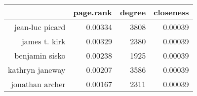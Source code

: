 \begin{table}[ht]
\centering
\begin{tabular}{rrrr}
  \hline
 & page.rank & degree & closeness \\ 
  \hline
jean-luc picard & 0.00334 & 3808 & 0.00039 \\ 
  james t. kirk & 0.00329 & 2380 & 0.00039 \\ 
  benjamin sisko & 0.00238 & 1925 & 0.00039 \\ 
  kathryn janeway & 0.00207 & 3586 & 0.00039 \\ 
  jonathan archer & 0.00167 & 2311 & 0.00039 \\ 
   \hline
\end{tabular}
\end{table}
